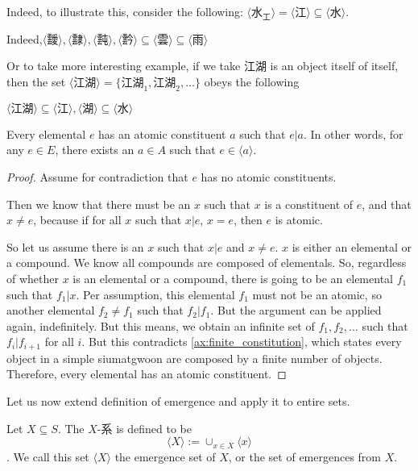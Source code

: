 Indeed, to illustrate this, consider the following:
$\langle \text{水}_\text{工} \rangle = \langle \text{江} \rangle \subseteq
\langle \text{水} \rangle$. 

Indeed,$\langle \text{靉} \rangle, \langle \text{霴} \rangle, \langle \text{霕} \rangle, \langle \text{霒} \rangle \subseteq \langle \text{雲} \rangle \subseteq \langle \text{雨} \rangle$

Or to take more interesting example, if we take $\text{江湖}$ is an object itself of itself, then the set $\langle \text{江湖} \rangle = \{\text{江湖}_{1}, \text{江湖}_{2}, \ldots\}$ obeys the following 

$\langle \text{江湖} \rangle \subseteq \langle \text{江} \rangle,  \langle \text{湖} \rangle \subseteq \langle \text{水} \rangle$

\begin{lemma}\label{lem:every-elemental-has-an-atomic-constituent}
    Every elemental $e$ has an atomic constituent $a$ such that $e|a$. In other words, for any $e \in E$, there exists an $a \in A$ such that $e \in \langle a \rangle$.
\end{lemma}
\begin{proof}
    Assume for contradiction that $e$ has no atomic constituents. 

    Then we know that there must be an $x$ such that $x$ is a constituent of $e$, and that $x\neq e$, because if for all $x$ such that $x|e$, $x=e$, then $e$ is atomic. 

    So let us assume there is an $x$ such that $x|e$ and $x\neq e$. $x$ is either an elemental or a compound. We know all compounds are composed of elementals. So, regardless of whether $x$ is an elemental or a compound, there is going to be an elemental $f_1$ such that $f_1|x$. Per assumption, this elemental $f_1$ must not be an atomic, so another elemental $f_2\neq f_1$ such that $f_2|f_1$. But the argument can be applied again, indefinitely. But this means, we obtain an infinite set of $f_1, f_2, \ldots$ such that $f_i|f_{i+1}$ for all $i$. But this contradicts \ref{ax:finite_constitution}, which states every object in a simple siumatgwoon are composed by a finite number of objects. Therefore, every elemental has an atomic constituent.
\end{proof}




Let us now extend definition of emergence and apply it to entire sets. 
    
\begin{definition}[X-系]\label{def:hais-of-sets}
        Let $X\subseteq S$. The $X$-系 is defined to be $$\langle X \rangle := \cup_{x\in X} \langle x \rangle$$. We call this set  $\langle X \rangle$ the emergence set of $X$, or the set of emergences from $X$.
\end{definition}

